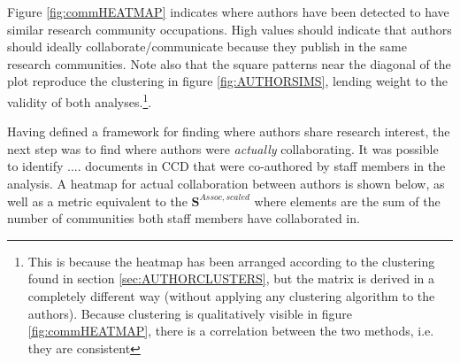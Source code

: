 Figure \ref{fig:commHEATMAP} indicates where authors have been detected to have similar research community occupations. High values should indicate that authors should ideally collaborate/communicate because they publish in the same research communities. Note also that the square patterns near the diagonal of the plot reproduce the clustering in figure \ref{fig:AUTHORSIMS}, lending weight to the validity of both analyses.\footnote{This is because the heatmap has been arranged according to the clustering found in section \ref{sec:AUTHORCLUSTERS}, but the matrix is derived in a completely different way (without applying any  clustering algorithm to the authors). Because clustering is qualitatively visible in figure \ref{fig:commHEATMAP}, there is a correlation between the two methods, i.e. they are consistent}.

Having defined a framework for finding where authors share research interest, the next step was to find where authors were \emph{actually} collaborating. It was possible to identify .... documents in CCD that were co-authored by staff members in the analysis. A heatmap for actual collaboration between authors is shown below, as well as a metric equivalent to the $\mathbf{S}^{Assoc,scaled}$ where elements are the sum of the number of communities both staff members have collaborated in.

